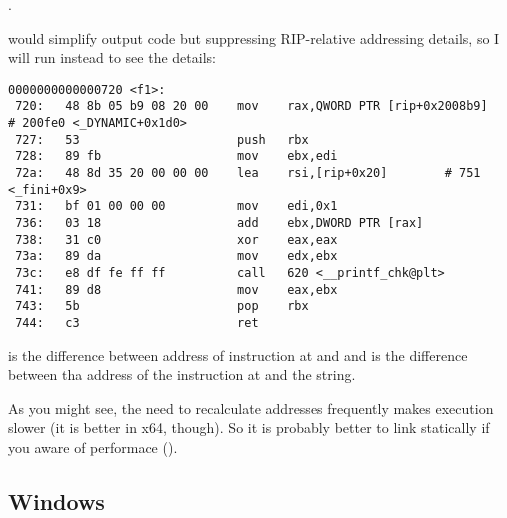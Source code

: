 .

\IDA {}
{would simplify output code but suppressing RIP-relative addressing details, so I will run  instead to see the details}:

\begin{lstlisting}
0000000000000720 <f1>:
 720:	48 8b 05 b9 08 20 00 	mov    rax,QWORD PTR [rip+0x2008b9]        # 200fe0 <_DYNAMIC+0x1d0>
 727:	53                   	push   rbx
 728:	89 fb                	mov    ebx,edi
 72a:	48 8d 35 20 00 00 00 	lea    rsi,[rip+0x20]        # 751 <_fini+0x9>
 731:	bf 01 00 00 00       	mov    edi,0x1
 736:	03 18                	add    ebx,DWORD PTR [rax]
 738:	31 c0                	xor    eax,eax
 73a:	89 da                	mov    edx,ebx
 73c:	e8 df fe ff ff       	call   620 <__printf_chk@plt>
 741:	89 d8                	mov    eax,ebx
 743:	5b                   	pop    rbx
 744:	c3                   	ret    
\end{lstlisting}

 
{is the difference between address of instruction at  and \globvar{} and 
 is the difference between tha address of the instruction at 
 and the \retstring{} string}.

{As you might see, the need to recalculate addresses frequently makes execution slower 
(it is better in x64, though)}.
{So it is probably better to link statically if you aware of performace} (\cite{AgnerFogCPP}).

\subsection{Windows}

